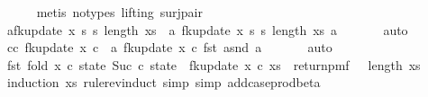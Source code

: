 \begin{isabellebody}
\ \ \ \ \isamarkupfalse%
\ {\isacharparenleft}{\kern0pt}metis\ {\isacharparenleft}{\kern0pt}no{\isacharunderscore}{\kern0pt}types{\isacharcomma}{\kern0pt}\ lifting{\isacharparenright}{\kern0pt}\ surj{\isacharunderscore}{\kern0pt}pair{\isacharparenright}{\kern0pt}\isanewline
\ \ \isamarkupfalse%
\ a{\isacharcolon}{\kern0pt}{\isachardoublequoteopen}fk{\isacharunderscore}{\kern0pt}update{\isacharprime}{\kern0pt}\ x\ s\ s\ {\isacharparenleft}{\kern0pt}length\ xs{\isacharparenright}{\kern0pt}\ {\isacharequal}{\kern0pt}\ {\isacharparenleft}{\kern0pt}{\isasymlambda}a{\isachardot}{\kern0pt}\ fk{\isacharunderscore}{\kern0pt}update{\isacharprime}{\kern0pt}\ x\ s\ s\ {\isacharparenleft}{\kern0pt}length\ xs{\isacharparenright}{\kern0pt}\ a{\isacharparenright}{\kern0pt}{\isachardoublequoteclose}\ \isanewline
\ \ \ \ \isamarkupfalse%
\ auto\isanewline
\ \ \isamarkupfalse%
\ c{\isacharcolon}{\kern0pt}{\isachardoublequoteopen}{\isasymAnd}c{\isachardot}{\kern0pt}\ fk{\isacharunderscore}{\kern0pt}update{\isacharprime}{\kern0pt}{\isacharprime}{\kern0pt}\ x\ c\ {\isacharequal}{\kern0pt}\ {\isacharparenleft}{\kern0pt}{\isasymlambda}a{\isachardot}{\kern0pt}\ fk{\isacharunderscore}{\kern0pt}update{\isacharprime}{\kern0pt}{\isacharprime}{\kern0pt}\ x\ c\ {\isacharparenleft}{\kern0pt}fst\ a{\isacharcomma}{\kern0pt}snd\ a{\isacharparenright}{\kern0pt}{\isacharparenright}{\kern0pt}{\isachardoublequoteclose}\ \isanewline
\ \ \ \ \isamarkupfalse%
\ auto\isanewline
\ \ \isamarkupfalse%
\ {\isachardoublequoteopen}fst\ {\isacharparenleft}{\kern0pt}fold\ {\isacharparenleft}{\kern0pt}{\isasymlambda}x\ {\isacharparenleft}{\kern0pt}c{\isacharcomma}{\kern0pt}\ state{\isacharparenright}{\kern0pt}{\isachardot}{\kern0pt}\ {\isacharparenleft}{\kern0pt}Suc\ c{\isacharcomma}{\kern0pt}\ state\ {\isasymbind}\ fk{\isacharunderscore}{\kern0pt}update{\isacharprime}{\kern0pt}{\isacharprime}{\kern0pt}\ x\ c{\isacharparenright}{\kern0pt}{\isacharparenright}{\kern0pt}\ xs\ {\isacharparenleft}{\kern0pt}{}{\isacharcomma}{\kern0pt}\ return{\isacharunderscore}{\kern0pt}pmf\ {\isacharparenleft}{\kern0pt}{}{\isacharcomma}{\kern0pt}{}{\isacharparenright}{\kern0pt}{\isacharparenright}{\kern0pt}{\isacharparenright}{\kern0pt}\ {\isacharequal}{\kern0pt}\ length\ xs{\isachardoublequoteclose}\isanewline
\ \ \ \ \isamarkupfalse%
\ {\isacharparenleft}{\kern0pt}induction\ xs\ rule{\isacharcolon}{\kern0pt}rev{\isacharunderscore}{\kern0pt}induct{\isacharcomma}{\kern0pt}\ simp{\isacharcomma}{\kern0pt}\ simp\ add{\isacharcolon}{\kern0pt}case{\isacharunderscore}{\kern0pt}prod{\isacharunderscore}{\kern0pt}beta{\isacharparenright}{\kern0pt}\isanewline

\end{isabellebody}
